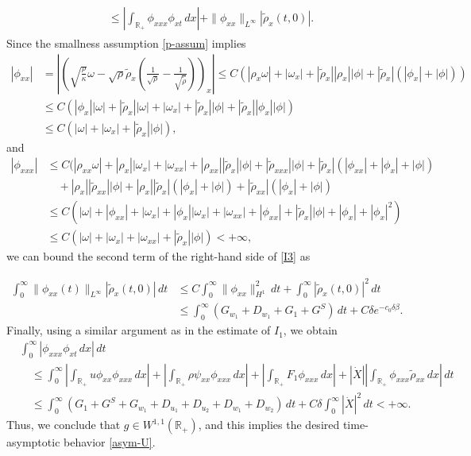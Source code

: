 \documentclass[11pt,reqno]{amsart}
\numberwithin{equation}{section} %
\newcommand{\R}{\mathbb{R}}
\begin{document}
\begin{appendix}
\begin{align}
\begin{aligned}
	&\le\left|\int_{\R_+}\phi_{xxx}\phi_{xt}\,dx\right|+\|\phi_{xx}\|_{L^\infty}|\tilde{\rho}_x(t,0)|.
\end{aligned}
\end{align}
Since the smallness assumption \eqref{p-assum} implies
\begin{align*}
	|\phi_{xx}| &= \left|\left(\sqrt{\frac{\rho}{\kappa}}\omega-\sqrt{\rho}\tilde{\rho}_x\left(\frac{1}{\sqrt{\rho}}-\frac{1}{\sqrt{\tilde{\rho}}}\right)\right)_x\right|\le C(|\rho_x\omega|+|\omega_x|+|\tilde{\rho}_x||\rho_x||\phi|+|\tilde{\rho}_x|(|\phi_x|+|\phi|))\\
	&\le C(|\phi_x||\omega|+|\tilde{\rho}_x||\omega|+|\omega_x|+|\tilde{\rho}_x||\phi|+|\tilde{\rho}_x||\phi_x||\phi|)\\
	&\le C(|\omega|+|\omega_x|+|\tilde{\rho}_x||\phi|),
\end{align*}
and
\begin{align*}
	|\phi_{xxx}|&\le C(|\rho_{xx}\omega|+|\rho_x||\omega_x|+|\omega_{xx}|+|\rho_{xx}||\tilde{\rho}_x||\phi|+|\tilde{\rho}_{xxx}||\phi|+|\tilde{\rho}_x|(|\phi_{xx}|+|\phi_x|+|\phi|)\\&
	\quad + |\rho_x||\tilde{\rho}_{xx}||\phi|+|\rho_x||\tilde{\rho}_x|(|\phi_x|+|\phi|)+|\tilde{\rho}_{xx}|(|\phi_x|+|\phi|)\\
	&\le C(|\omega|+|\phi_{xx}|+|\omega_x|+|\phi_x||\omega_x|+|\omega_{xx}|+|\phi_{xx}|+|\tilde{\rho}_x||\phi|+|\phi_x|+|\phi_x|^2)\\
	&\le C(|\omega|+|\omega_x|+|\omega_{xx}|+|\tilde{\rho}_x||\phi|)<+\infty,
\end{align*}
we can bound the second term of the right-hand side of \eqref{I3} as

\begin{align*}
	\int_0^\infty \|\phi_{xx}(t)\|_{L^\infty}|\tilde{\rho}_x(t,0)|\,dt&\le C\int_0^\infty \|\phi_{xx}\|_{H^1}^2\,dt +\int_0^\infty |\tilde{\rho}_x(t,0)|^2\,dt\\
	&\le\int_0^\infty (G_{w_1}+D_{w_1}+G_1+G^S)\,dt+C\delta e^{-c_0\delta\beta}.
\end{align*}
Finally, using a similar argument as in the estimate of $I_1$, we obtain
\begin{align*}
	&\int_0^\infty \left|\phi_{xxx}\phi_{xt}\,dx \right|\,dt\\
    &\quad \leq \int_0^\infty\left|\int_{\R_+}u\phi_{xx}\phi_{xxx}\,dx\right| +\left|\int_{\R_+}\rho\psi_{xx}\phi_{xxx}\,dx\right|+\left|\int_{\R_+}F_1\phi_{xxx}\,dx\right|+|\dot{X}|\left|\int_{\R_+}\phi_{xxx}\tilde{\rho}_{xx}\,dx\right|\,dt\\
	&\quad \le\int_0^\infty (G_1+G^S+G_{w_1}+D_{u_1}+D_{u_2}+D_{w_1}+D_{w_2})\,dt+C\delta\int_0^\infty |\dot{X}|^2\,dt<+\infty.
\end{align*}
Thus, we conclude that $g\in W^{1,1}(\R_+)$, and this implies the desired time-asymptotic behavior \eqref{asym-U}.


\end{appendix}
\end{document}
